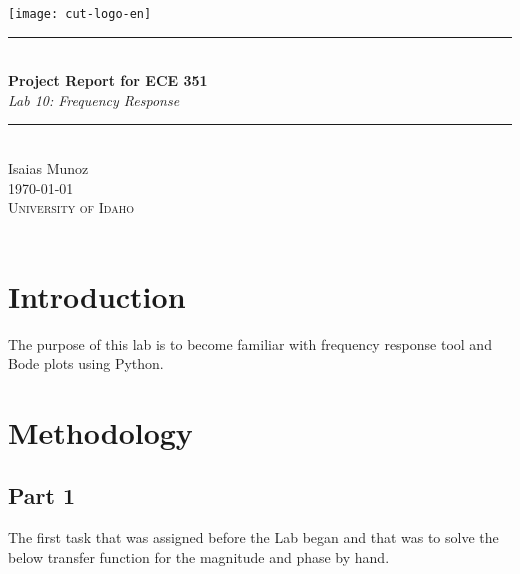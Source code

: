 \documentclass[12pt,a4paper]{article}
\newcommand{\HRule}{\rule{\linewidth}{0.5mm}}
\begin{document}
\begin{titlepage}
\begin{center}
\texttt{[image: cut-logo-en]}~\\[2cm]
\HRule \\[0.4cm]
{ \LARGE 
  \textbf{Project Report for ECE 351}\\[0.4cm]
  \emph{Lab 10: Frequency Response}\\[0.4cm]
}
\HRule \\[1.5cm]
{ \large
  Isaias Munoz  \\[0.1cm]
  \today\\[0.1cm]
}
\vfill
\textsc{\Large University of Idaho}\\
\\
 
\end{center}
\end{titlepage}
\newpage
\tableofcontents
{}
\newpage
\setcounter{page}{1}
\section{Introduction}\label{sec:intro}

The purpose of this lab is to become familiar with frequency response tool and Bode plots using Python. 





\section{Methodology}\label{sec:meth}
\subsection{Part 1}
The first task that was assigned before the Lab began and that was to solve the below transfer function for  the magnitude and phase by hand. 
\end{document}
